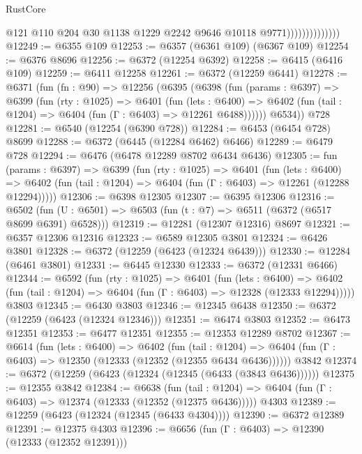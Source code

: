 \begin{lexlean}{RustCore}
\begin{coremodule}
                                @121
                                @110
                                @204
                                @30
                                @1138
                                @1229
                                @2242
                                @9646
                                @10118
                                @9771))))))))))))))
@12249 := @6355 @109
@12253 := @6357 (@6361 @109) (@6367 @109)
@12254 := @6376 @8696
@12256 := @6372 (@12254 @6392)
@12258 := @6415 (@6416 @109)
@12259 := @6411 @12258
@12261 := @6372 (@12259 @6441)
@12278 := @6371
    (fun (fn : @90) =>
    @12256
      (@6395
        (@6398
          (fun (params : @6397) =>
          @6399
            (fun (rty : @1025) =>
            @6401
              (fun (lets : @6400) =>
              @6402 (fun (tail : @1204) => @6404 (fun (Γ : @6403) => @12261 @6488))))))
        @6534))
    @728
@12281 := @6540 (@12254 (@6390 @728))
@12284 := @6453 (@6454 @728) @8699
@12288 := @6372 (@6445 (@12284 @6462) @6466)
@12289 := @6479 @728
@12294 := @6476 (@6478 @12289 @8702 @6434 @6436)
@12305 := fun (params : @6397) =>
  @6399
    (fun (rty : @1025) =>
    @6401
      (fun (lets : @6400) =>
      @6402 (fun (tail : @1204) => @6404 (fun (Γ : @6403) => @12261 (@12288 @12294)))))
@12306 := @6398 @12305
@12307 := @6395 @12306
@12316 := @6502 (fun (U : @6501) => @6503 (fun (t : @7) => @6511 (@6372 (@6517 @8699 @6391) @6528)))
@12319 := @12281 (@12307 @12316) @8697
@12321 := @6357 @12306 @12316
@12323 := @6589 @12305 @3801
@12324 := @6426 @3801
@12328 := @6372 (@12259 (@6423 (@12324 @6439)))
@12330 := @12284 (@6461 @3801)
@12331 := @6445 @12330
@12333 := @6372 (@12331 @6466)
@12344 := @6592
    (fun (rty : @1025) =>
    @6401
      (fun (lets : @6400) =>
      @6402 (fun (tail : @1204) => @6404 (fun (Γ : @6403) => @12328 (@12333 @12294)))))
    @3803
@12345 := @6430 @3803
@12346 := @12345 @6438
@12350 := @6372 (@12259 (@6423 (@12324 @12346)))
@12351 := @6474 @3803
@12352 := @6473 @12351
@12353 := @6477 @12351
@12355 := @12353 @12289 @8702
@12367 := @6614
    (fun (lets : @6400) =>
    @6402
      (fun (tail : @1204) =>
      @6404 (fun (Γ : @6403) => @12350 (@12333 (@12352 (@12355 @6434 @6436))))))
    @3842
@12374 := @6372 (@12259 (@6423 (@12324 (@12345 (@6433 (@3843 @6436))))))
@12375 := @12355 @3842
@12384 := @6638
    (fun (tail : @1204) => @6404 (fun (Γ : @6403) => @12374 (@12333 (@12352 (@12375 @6436)))))
    @4303
@12389 := @12259 (@6423 (@12324 (@12345 (@6433 @4304))))
@12390 := @6372 @12389
@12391 := @12375 @4303
@12396 := @6656 (fun (Γ : @6403) => @12390 (@12333 (@12352 @12391)))

\end{coremodule}
\end{lexlean}
